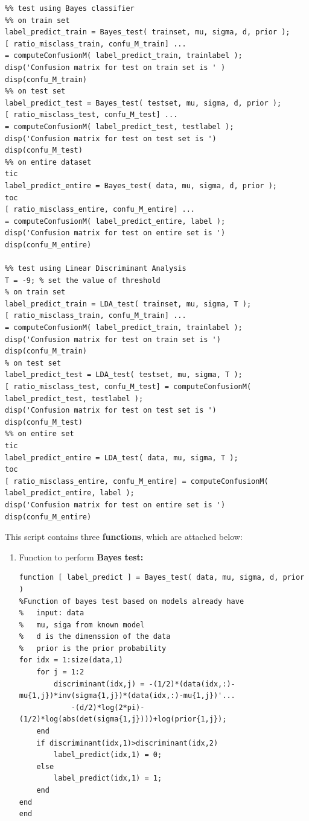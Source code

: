 \documentclass[a4paper]{article}
\begin{document}
\begin{spacing}{2.0}
\begin{lstlisting}
%% test using Bayes classifier
%% on train set
label_predict_train = Bayes_test( trainset, mu, sigma, d, prior );
[ ratio_misclass_train, confu_M_train] ...
= computeConfusionM( label_predict_train, trainlabel );
disp('Confusion matrix for test on train set is ' )
disp(confu_M_train)
%% on test set
label_predict_test = Bayes_test( testset, mu, sigma, d, prior );
[ ratio_misclass_test, confu_M_test] ...
= computeConfusionM( label_predict_test, testlabel );
disp('Confusion matrix for test on test set is ')
disp(confu_M_test)
%% on entire dataset
tic 
label_predict_entire = Bayes_test( data, mu, sigma, d, prior );
toc
[ ratio_misclass_entire, confu_M_entire] ...
= computeConfusionM( label_predict_entire, label );
disp('Confusion matrix for test on entire set is ')
disp(confu_M_entire)

%% test using Linear Discriminant Analysis
T = -9; % set the value of threshold
% on train set
label_predict_train = LDA_test( trainset, mu, sigma, T );
[ ratio_misclass_train, confu_M_train] ...
= computeConfusionM( label_predict_train, trainlabel );
disp('Confusion matrix for test on train set is ')
disp(confu_M_train)
% on test set
label_predict_test = LDA_test( testset, mu, sigma, T );
[ ratio_misclass_test, confu_M_test] = computeConfusionM( label_predict_test, testlabel );
disp('Confusion matrix for test on test set is ')
disp(confu_M_test)
%% on entire set
tic
label_predict_entire = LDA_test( data, mu, sigma, T );
toc
[ ratio_misclass_entire, confu_M_entire] = computeConfusionM( label_predict_entire, label );
disp('Confusion matrix for test on entire set is ')
disp(confu_M_entire)
\end{lstlisting}
\Large{This script contains three \textbf{functions}, which are attached below:}
\normalsize
\begin{enumerate}
\item Function to perform \textbf{Bayes test:} 
\begin{lstlisting}
function [ label_predict ] = Bayes_test( data, mu, sigma, d, prior )
%Function of bayes test based on models already have
%	input: data
%	mu, siga from known model
%	d is the dimenssion of the data
%	prior is the prior probability
for idx = 1:size(data,1)
    for j = 1:2
        discriminant(idx,j) = -(1/2)*(data(idx,:)-mu{1,j})*inv(sigma{1,j})*(data(idx,:)-mu{1,j})'...
            -(d/2)*log(2*pi)-(1/2)*log(abs(det(sigma{1,j})))+log(prior{1,j});
    end 
    if discriminant(idx,1)>discriminant(idx,2)
        label_predict(idx,1) = 0;
    else
        label_predict(idx,1) = 1;
    end
end
end
\end{lstlisting}

\end{enumerate}
\end{spacing}
\end{document}

